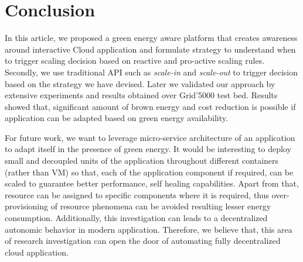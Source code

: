 \section{Conclusion}

In this article, we proposed a green energy aware platform that creates awareness around interactive Cloud application and formulate strategy to understand when to trigger scaling decision based on reactive and pro-active scaling rules. Secondly, we use traditional API such as \emph{scale-in} and \emph{scale-out} to trigger decision based on the strategy we have devised. Later we validated our approach by extensive experiments and results obtained over Grid'5000 test bed. Results showed that, significant amount of brown energy and cost reduction is possible if application can be adapted based on green energy availability.

For future work, we want to leverage micro-service architecture of an application to adapt itself in the presence of green energy. It would be interesting to deploy small and decoupled units of the application
throughout different containers (rather than VM) so that, each of the application component if required, can be scaled to guarantee better performance, self healing capabilities. Apart from that, resource can be assigned to specific components where it is required, thus over-provisioning of resource phenomena can be avoided resulting lesser energy consumption. Additionally, this investigation can leads to a decentralized autonomic behavior in modern
application. Therefore, we believe that, this area of research
investigation can open the door of automating fully decentralized cloud application.

